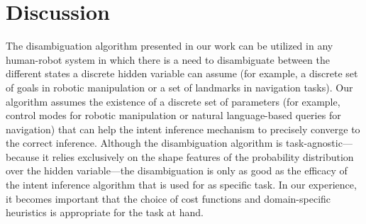 \documentclass[journal]{IEEEtran}
\begin{document}
\section{Discussion}\label{sec:discussion}
The disambiguation algorithm presented in our work can be utilized in any human-robot system in which there is a need to disambiguate between the different states a discrete hidden variable can assume (for example, a discrete set of goals in robotic manipulation or a set of landmarks in navigation tasks). Our algorithm assumes the existence of a discrete set of parameters (for example, control modes for robotic manipulation or natural language-based queries for navigation) that can help the intent inference mechanism to precisely converge to the correct inference. Although the disambiguation algorithm is task-agnostic---because it relies exclusively on the shape features of the probability distribution over the hidden variable---the disambiguation is only as good as the efficacy of the intent inference algorithm that is used for as specific task. In our experience, it becomes important that the choice of cost functions and domain-specific heuristics is appropriate for the task at hand. 
\end{document}
